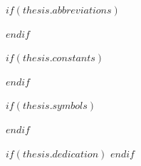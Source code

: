 \begingroup
\hypersetup{linkcolor=$if(toclinkcolor)$$toclinkcolor$$else$black$endif$}

\tableofcontents
\clearpage

\listoffigures
\clearpage

\listoftables
\clearpage

\endgroup


$if(thesis.abbreviations)$
\addchaptertocentry{\abbrevname}

\clearpage
$endif$

$if(thesis.constants)$
\addchaptertocentry{\constantsname}

\clearpage
$endif$

$if(thesis.symbols)$
\addchaptertocentry{\symbolsname}

\clearpage
$endif$

$if(thesis.dedication)$
\dedicatory{}
$endif$

\mainmatter
\pagestyle{thesis}
